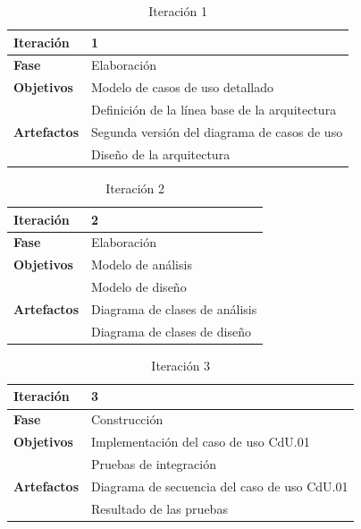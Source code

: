 \begin{table}[htb]
    \centering
    \caption{Iteración 1}
    \label{tab:resultados.planificacion.iter.1}
    \begin{tabular}[t]{| l || p{8cm} |}
        \hline
        \textbf{Iteración} & 1 \\ \hline
        \textbf{Fase} & Elaboración \\ \hline
        \multirow{1}{*}{\textbf{Objetivos}}
        & Modelo de casos de uso detallado \\ \cline{2-2}
        & Definición de la línea base de la arquitectura \\ \hline
        \multirow{1}{*}{\textbf{Artefactos}}
        & Segunda versión del diagrama de casos de uso \\ \cline{2-2}
        & Diseño de la arquitectura \\
        \hline
    \end{tabular}
\end{table}

\begin{table}[htb]
    \centering
    \caption{Iteración 2}
    \label{tab:resultados.planificacion.iter.2}
    \begin{tabular}[t]{| l || p{8cm} |}
        \hline
        \textbf{Iteración} & 2 \\ \hline
        \textbf{Fase} & Elaboración \\ \hline
        \multirow{1}{*}{\textbf{Objetivos}}
        & Modelo de análisis \\ \cline{2-2}
        & Modelo de diseño \\ \hline
        \multirow{1}{*}{\textbf{Artefactos}}
        & Diagrama de clases de análisis \\ \cline{2-2}
        & Diagrama de clases de diseño \\
        \hline
    \end{tabular}
\end{table}

\begin{table}[htb]
    \centering
    \caption{Iteración 3}
    \label{tab:resultados.planificacion.iter.3}
    \begin{tabular}[t]{| l || p{8cm} |}
        \hline
        \textbf{Iteración} & 3 \\ \hline
        \textbf{Fase} & Construcción \\ \hline
        \multirow{1}{*}{\textbf{Objetivos}}
        & Implementación del caso de uso CdU.01 \\ \cline{2-2}
        & Pruebas de integración \\ \hline
        \multirow{1}{*}{\textbf{Artefactos}}
        & Diagrama de secuencia del caso de uso CdU.01 \\ \cline{2-2}
        & Resultado de las pruebas \\
        \hline
    \end{tabular}
\end{table}

